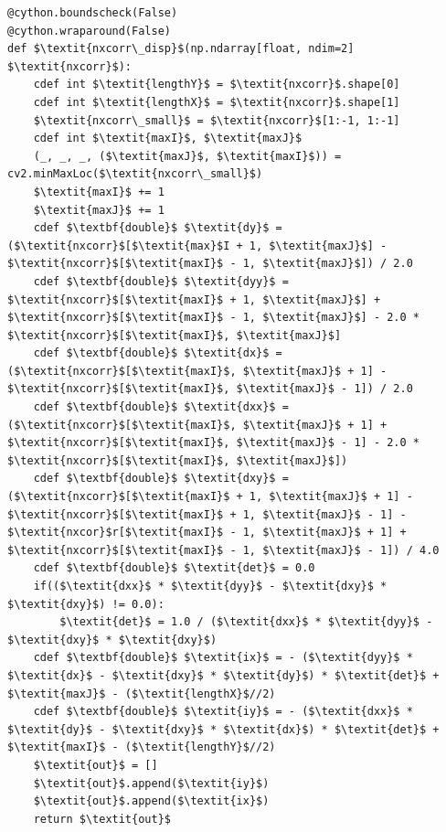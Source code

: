 \begin{lstlisting}[caption={Die in Cython optimierte Funktion nxcorr\_disp()}, label={lst:cython_nxd}]
@cython.boundscheck(False)
@cython.wraparound(False)
def $\textit{nxcorr\_disp}$(np.ndarray[float, ndim=2] $\textit{nxcorr}$):
	cdef int $\textit{lengthY}$ = $\textit{nxcorr}$.shape[0]
	cdef int $\textit{lengthX}$ = $\textit{nxcorr}$.shape[1]
	$\textit{nxcorr\_small}$ = $\textit{nxcorr}$[1:-1, 1:-1]
	cdef int $\textit{maxI}$, $\textit{maxJ}$
	(_, _, _, ($\textit{maxJ}$, $\textit{maxI}$)) = cv2.minMaxLoc($\textit{nxcorr\_small}$)
	$\textit{maxI}$ += 1
	$\textit{maxJ}$ += 1
	cdef $\textbf{double}$ $\textit{dy}$ = ($\textit{nxcorr}$[$\textit{max}$I + 1, $\textit{maxJ}$] - $\textit{nxcorr}$[$\textit{maxI}$ - 1, $\textit{maxJ}$]) / 2.0
	cdef $\textbf{double}$ $\textit{dyy}$ = $\textit{nxcorr}$[$\textit{maxI}$ + 1, $\textit{maxJ}$] + $\textit{nxcorr}$[$\textit{maxI}$ - 1, $\textit{maxJ}$] - 2.0 * $\textit{nxcorr}$[$\textit{maxI}$, $\textit{maxJ}$]
	cdef $\textbf{double}$ $\textit{dx}$ = ($\textit{nxcorr}$[$\textit{maxI}$, $\textit{maxJ}$ + 1] - $\textit{nxcorr}$[$\textit{maxI}$, $\textit{maxJ}$ - 1]) / 2.0
	cdef $\textbf{double}$ $\textit{dxx}$ = ($\textit{nxcorr}$[$\textit{maxI}$, $\textit{maxJ}$ + 1] + $\textit{nxcorr}$[$\textit{maxI}$, $\textit{maxJ}$ - 1] - 2.0 * $\textit{nxcorr}$[$\textit{maxI}$, $\textit{maxJ}$])
	cdef $\textbf{double}$ $\textit{dxy}$ = ($\textit{nxcorr}$[$\textit{maxI}$ + 1, $\textit{maxJ}$ + 1] - $\textit{nxcorr}$[$\textit{maxI}$ + 1, $\textit{maxJ}$ - 1] - $\textit{nxcor}$r[$\textit{maxI}$ - 1, $\textit{maxJ}$ + 1] + $\textit{nxcorr}$[$\textit{maxI}$ - 1, $\textit{maxJ}$ - 1]) / 4.0
	cdef $\textbf{double}$ $\textit{det}$ = 0.0
	if(($\textit{dxx}$ * $\textit{dyy}$ - $\textit{dxy}$ * $\textit{dxy}$) != 0.0):
		$\textit{det}$ = 1.0 / ($\textit{dxx}$ * $\textit{dyy}$ - $\textit{dxy}$ * $\textit{dxy}$)
	cdef $\textbf{double}$ $\textit{ix}$ = - ($\textit{dyy}$ * $\textit{dx}$ - $\textit{dxy}$ * $\textit{dy}$) * $\textit{det}$ + $\textit{maxJ}$ - ($\textit{lengthX}$//2)
	cdef $\textbf{double}$ $\textit{iy}$ = - ($\textit{dxx}$ * $\textit{dy}$ - $\textit{dxy}$ * $\textit{dx}$) * $\textit{det}$ + $\textit{maxI}$ - ($\textit{lengthY}$//2)
	$\textit{out}$ = []
	$\textit{out}$.append($\textit{iy}$)
	$\textit{out}$.append($\textit{ix}$)
	return $\textit{out}$
\end{lstlisting}